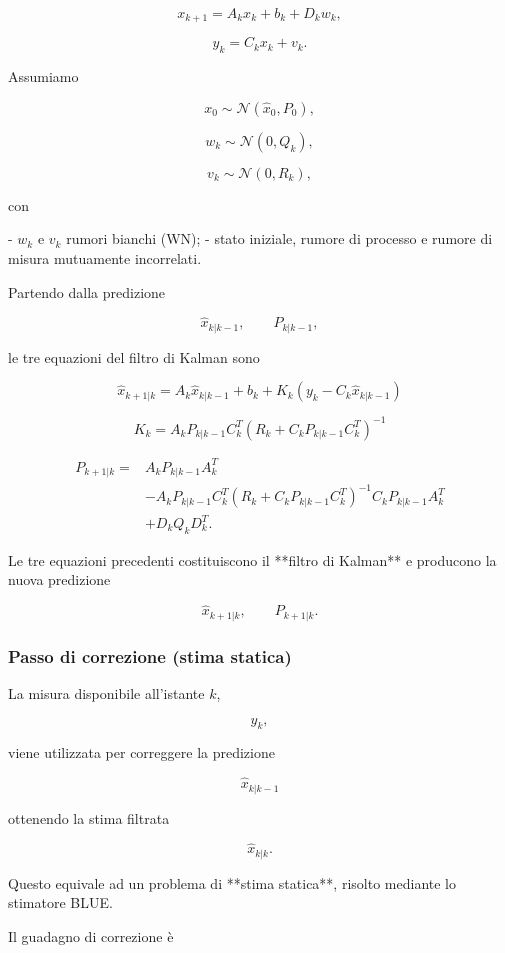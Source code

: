 \documentclass[11pt,a4paper]{article}
\begin{document}
\[
x_{k+1}=A_kx_k+b_k+D_kw_k,
\]

\[
y_k=C_kx_k+v_k.
\]

Assumiamo

\[
x_0\sim\mathcal N(\hat{x}_0,P_0),
\]

\[
w_k\sim\mathcal N(0,Q_k),
\]

\[
v_k\sim\mathcal N(0,R_k),
\]

con

- \(w_k\) e \(v_k\) rumori bianchi (WN);
- stato iniziale, rumore di processo e rumore di misura mutuamente incorrelati.

Partendo dalla predizione

\[
\hat{x}_{k|k-1},
\qquad
P_{k|k-1},
\]

le tre equazioni del filtro di Kalman sono

\[
\boxed{
\hat{x}_{k+1|k}
=
A_k\hat{x}_{k|k-1}
+b_k
+
K_k
\left(
y_k-C_k\hat{x}_{k|k-1}
\right)
}
\]

\[
\boxed{
K_k
=
A_kP_{k|k-1}C_k^T
\left(
R_k+C_kP_{k|k-1}C_k^T
\right)^{-1}
}
\]

\[
\boxed{
\begin{aligned}
P_{k+1|k}
=
&
A_kP_{k|k-1}A_k^T
\\
&
-
A_kP_{k|k-1}C_k^T
\left(
R_k+C_kP_{k|k-1}C_k^T
\right)^{-1}
C_kP_{k|k-1}A_k^T
\\
&
+
D_kQ_kD_k^T.
\end{aligned}
}
\]

Le tre equazioni precedenti costituiscono il **filtro di Kalman** e producono la nuova predizione

\[
\boxed{
\hat{x}_{k+1|k},
\qquad
P_{k+1|k}.
}
\]

\subsubsection*{Passo di correzione (stima statica)}

La misura disponibile all'istante \(k\),

\[
y_k,
\]

viene utilizzata per correggere la predizione

\[
\hat{x}_{k|k-1}
\]

ottenendo la stima filtrata

\[
\hat{x}_{k|k}.
\]

Questo equivale ad un problema di **stima statica**, risolto mediante lo stimatore BLUE.

Il guadagno di correzione è
\end{document}
